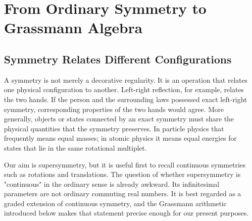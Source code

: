 \chapter{From Ordinary Symmetry to Grassmann Algebra}


\section{Symmetry Relates Different Configurations}

A symmetry is not merely a decorative regularity. It is an operation that relates one physical configuration to another. Left-right reflection, for example, relates the two hands. If the person and the surrounding laws possessed exact left-right symmetry, corresponding properties of the two hands would agree. More generally, objects or states connected by an exact symmetry must share the physical quantities that the symmetry preserves. In particle physics that frequently means equal masses; in atomic physics it means equal energies for states that lie in the same rotational multiplet.

Our aim is supersymmetry, but it is useful first to recall continuous symmetries such as rotations and translations. The question of whether supersymmetry is "continuous" in the ordinary sense is already awkward. Its infinitesimal parameters are not ordinary commuting real numbers. It is best regarded as a graded extension of continuous symmetry, and the Grassmann arithmetic introduced below makes that statement precise enough for our present purposes. 

